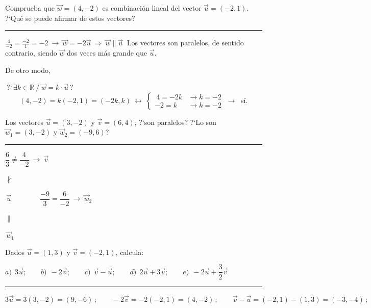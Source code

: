\vspace{5mm}
\begin{miejercicio}

Comprueba que $\vec w=(4,-2)$ es combinación lineal del vector $\vec u=(-2,1)$. ?`Qué se puede afirmar de estos vectores?

\rule{250pt}{0.1pt}

\vspace{2mm}  $\frac 4{-2}=\frac{-2}{1}= -2 \ \to \ \vec w=-2\vec u \ \Rightarrow \ \vec w \parallel \vec u\ $ Los vectores son paralelos, de sentido contrario, siendo $\vec w$ dos veces más grande que $\vec u$.

\color{gris}
\vspace{4mm} De otro modo, 

\vspace{2mm} $\ $?`$ \, \exists k\in \mathbb R \ / \ \vec w=k \cdot \vec u \, ?$ $\qquad (4,-2)=k(-2,1)=(-2k,k)\ \leftrightarrow \ \begin{cases}
 \ 	4=-2k &\to k=-2 \\ -2=k &\to k=-2 \end{cases} \ \to \ $ sí.
\color{black}
\end{miejercicio}

\begin{miejercicio}

Los vectores $\vec u=(3,-2)$ y $\vec v=(6,4)$, ?`son paralelos? ?`Lo son $\vec w_1=(3,-2)$ y $\vec w_2=(-9,6)$? 

\rule{250pt}{0.1pt}

\vspace{2mm} $\dfrac{6}{3} \neq \dfrac{4}{-2} \ \to \ \vec v  \,$ \begin{Large}{$ \not \parallel$}\end{Large}$\,  \vec u  \qquad \qquad \dfrac{-9}{3}=\dfrac{6}{-2} \ \to \ \vec w_2 \,$\begin{Large}{$ \parallel$}\end{Large}$ \,  \vec w_1$
\end{miejercicio}


\begin{miejercicio}

Dados $\vec u=(1,3)$ y $\vec v=(-2,1)$, calcula:

\vspace{2mm} $a)\ \ 3\vec u; \qquad b)\ \ -2\vec v;\qquad c)\ \ \vec v-\vec u;\qquad d)\ \ 2\vec u+3\vec v;\qquad e)\ \ -2\vec u+\dfrac 3 2 \vec v$

\rule{250pt}{0.1pt}

\vspace{2mm}  $3\vec u=3(3,-2)=(9,-6)\, ; \qquad -2\vec v=-2(-2,1)=(4,-2)\, ; \qquad  \vec v-\vec u=(-2,1)-(1,3)=(-3,-4)\, ; \qquad 2\vec u+3\vec v=2(1,3)+3(-2,1)=(2,6)+(-6,3)=(-4,9)\, ; \qquad -2\vec u+\frac 32 \vec v=-2(1,3)+\frac 3 2 (-2,1)=(-2,-6)+(-3,\frac 3 2)=(-5,-\frac 9 2) $
\end{miejercicio}


